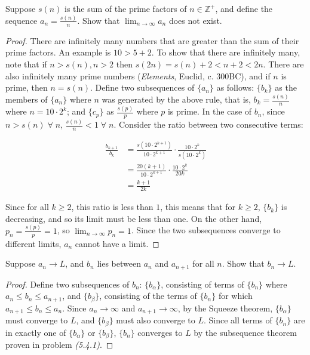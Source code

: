 
Suppose $s(n)$ is the sum of the prime factors of $n \in \mathbb{Z^+}$, and define the sequence $a_n = \frac{s(n)}{n}$. Show that $\lim_{n \rightarrow \infty} a_n$ does not exist.

\begin{proof}
  There are infinitely many numbers that are greater than the sum of their prime factors. An example is $10 > 5 + 2$. To show that there are infinitely many, note that if $n > s(n), n > 2$ then $s(2n) = s(n) + 2 < n + 2 < 2n$. There are also infinitely many prime numbers (\textit{Elements}, Euclid, c. 300BC), and if $n$ is prime, then $n = s(n)$.
  Define two subsequences of $\{a_n\}$ as follows: $\{b_k\}$ as the members of $\{a_n\}$ where $n$ was generated by the above rule, that is, $b_k = \frac{s(n)}{n}$ where $n = 10 \cdot 2^k$; and $\{c_p\}$ as $\frac{s(p)}{p}$ where $p$ is prime. In the case of $b_n$, since $n > s(n) \;\forall\; n$, $\frac{s(n)}{n} < 1 \;\forall\; n$. Consider the ratio between two consecutive terms:

  \begin{align*}
    \frac{b_{k + 1}}{b_k} &= \frac{s(10 \cdot 2^{k + 1})}{10 \cdot 2^{k + 1}} \cdot \frac{10 \cdot 2^k}{s(10 \cdot 2^k)} \\
    &= \frac{20(k + 1)}{10 \cdot 2^{k + 1}} \cdot \frac{10 \cdot 2^k}{20k} \\
    &= \frac{k + 1}{2k}
  \end{align*}

  Since for all $k \geq 2$, this ratio is less than $1$, this means that for $k \geq 2$, $\{b_k\}$ is decreasing, and so its limit must be less than one. On the other hand, $p_n = \frac{s(p)}{p} = 1$, so $\lim_{n \rightarrow \infty} p_n = 1$. Since the two subsequences converge to different limits, $a_n$ cannot have a limit.
\end{proof}


Suppose $a_n \rightarrow L$, and $b_n$ lies between $a_n$ and $a_{n + 1}$ for all $n$. Show that $b_n \rightarrow L$.

\begin{proof}
  Define two subsequences of $b_n$: $\{b_{\alpha}\}$, consisting of terms of $\{b_n\}$ where $a_n \leq b_n \leq a_{n + 1}$, and $\{b_{\beta}\}$, consisting of the terms of $\{b_n\}$ for which $a_{n + 1} \leq b_n \leq a_n$. Since $a_n \rightarrow \infty$ and $a_{n + 1} \rightarrow \infty$, by the Squeeze theorem, $\{b_{\alpha}\}$ must converge to $L$, and $\{b_{\beta}\}$ must also converge to $L$. Since all terms of $\{b_n\}$ are in exactly one of $\{b_{\alpha}\}$ or $\{b_{\beta}\}$, $\{b_n\}$ converges to $L$ by the subsequence theorem proven in problem \textit{(5.4.1)}.
\end{proof}


